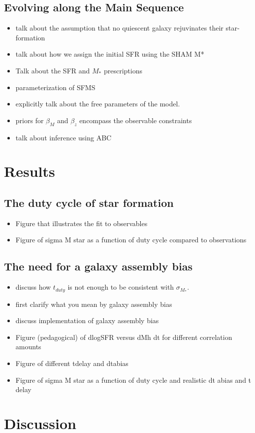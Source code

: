 \documentclass[12pt, letterpaper, preprint]{aastex}
\newcommand{\bitem}{\begin{itemize}}
\newcommand{\eitem}{\end{itemize}}
\begin{document}
\subsection{Evolving along the Main Sequence} 
\bitem
\item talk about the assumption that no quiescent galaxy rejuvinates their star-formation 
\item talk about how we assign the initial SFR using the SHAM M*
\item Talk about the SFR and $M_*$ prescriptions 
\item parameterization of SFMS 
\item explicitly talk about the free parameters of the model. 
\item priors for $\beta_M$ and $\beta_z$ encompass the observable constraints 
\item talk about inference using ABC
\eitem

\section{Results}
\subsection{The duty cycle of star formation}
\bitem
\item Figure that illustrates the fit to observables 
\item Figure of sigma M star as a function of duty cycle compared to observations 
\eitem 

\subsection{The need for a galaxy assembly bias}
\bitem
\item discuss how $t_{duty}$ is not enough to be consistent with $\sigma_{M_*}$. 
\item first clarify what you mean by galaxy assembly bias 
\item discuss implementation of galaxy assembly bias
\item Figure (pedagogical) of dlogSFR versus dMh dt for different correlation amounts 
\item Figure of different tdelay and dtabias 
\item Figure of sigma M star as a function of duty cycle and realistic dt abias and t delay 
\eitem

\section{Discussion} \label{sec:discussion}
\end{document}
